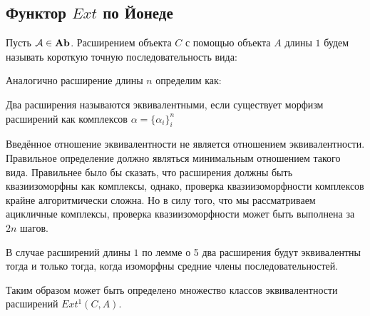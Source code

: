 \documentclass[../main.tex]{subfiles}
\begin{document}
\subsection{Функтор $Ext$ по Йонеде}
\begin{to_def}
Пусть $\mathcal{A} \in \mathbf{Ab}$. Расширением объекта $C$ с помощью объекта $A$ длины $1$ будем называть короткую точную последовательность вида:
\bee
{}
\eee
Аналогично расширение длины $n$ определим как:
\bee
{}
\eee
\end{to_def}
\begin{to_def}
Два расширения называются эквивалентными, если существует морфизм расширений как комплексов $\alpha = \{\alpha_i\}_i^{n}$
\bee
{}
\eee
\end{to_def}
\begin{to_com}
Введённое отношение эквивалентности не является отношением эквивалентности. Правильное определение должно являться минимальным отношением такого вида. Правильнее было бы сказать, что расширения должны быть квазиизоморфны как комплексы, однако, проверка квазиизоморфности комплексов крайне алгоритмически сложна. Но в силу того, что мы рассматриваем ацикличные комплексы, проверка квазиизоморфности может быть выполнена за $2n$ шагов.
\end{to_com}
В случае расширений длины $1$ по лемме о 5 два расширения будут эквивалентны тогда и только тогда, когда изоморфны средние члены последовательностей. 
\bee
{}
\eee
Таким образом может быть определено множество классов эквивалентности расширений $Ext^1(C, A)$.
\end{document}
